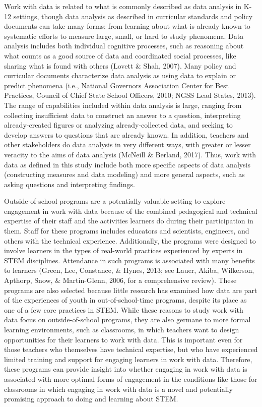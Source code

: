 \documentclass[]{book}
\theoremstyle{definition}
\theoremstyle{definition}
\theoremstyle{definition}
\theoremstyle{remark}
\begin{document}
Work with data is related to what is commonly described as data analysis
in K-12 settings, though data analysis as described in curricular
standards and policy documents can take many forms: from learning about
what is already known to systematic efforts to measure large, small, or
hard to study phenomena. Data analysis includes both individual
cognitive processes, such as reasoning about what counts as a good
source of data and coordinated social processes, like sharing what is
found with others (Lovett \& Shah, 2007). Many policy and curricular
documents characterize data analysis as using data to explain or predict
phenomena (i.e., National Governors Association Center for Best
Practices, Council of Chief State School Officers, 2010; NGSS Lead
States, 2013). The range of capabilities included within data analysis
is large, ranging from collecting insufficient data to construct an
answer to a question, interpreting already-created figures or analyzing
already-collected data, and seeking to develop answers to questions that
are already known. In addition, teachers and other stakeholders do data
analysis in very different ways, with greater or lesser veracity to the
aims of data analysis (McNeill \& Berland, 2017). Thus, work with data
as defined in this study include both more specific aspects of data
analysis (constructing measures and data modeling) and more general
aspects, such as asking questions and interpreting findings.

Outside-of-school programs are a potentially valuable setting to explore
engagement in work with data because of the combined pedagogical and
technical expertise of their staff and the activities learners do during
their participation in them. Staff for these programs includes educators
and scientists, engineers, and others with the technical experience.
Additionally, the programs were designed to involve learners in the
types of real-world practices experienced by experts in STEM
disciplines. Attendance in such programs is associated with many
benefits to learners (Green, Lee, Constance, \& Hynes, 2013; see Lauer,
Akiba, Wilkerson, Apthorp, Snow, \& Martin-Glenn, 2006, for a
comprehensive review). These programs are also selected because little
research has examined how data are part of the experiences of youth in
out-of-school-time programs, despite its place as one of a few core
practices in STEM. While these reasons to study work with data focus on
outside-of-school programs, they are also germane to more formal
learning environments, such as classrooms, in which teachers want to
design opportunities for their learners to work with data. This is
important even for those teachers who themselves have technical
expertise, but who have experienced limited training and support for
engaging learners in work with data. Therefore, these programs can
provide insight into whether engaging in work with data is associated
with more optimal forms of engagement in the conditions like those for
classrooms in which engaging in work with data is a novel and
potentially promising approach to doing and learning about STEM.
\end{document}

